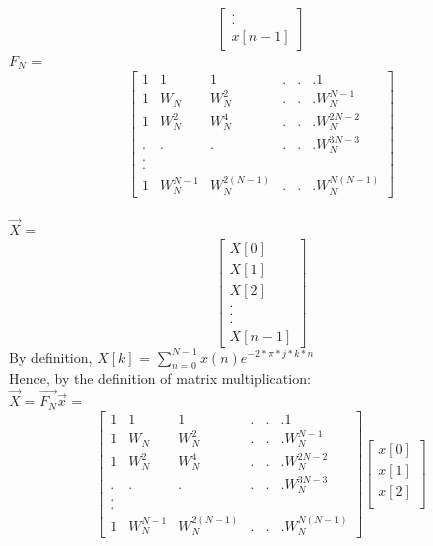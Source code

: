 \documentclass[journal,12pt,twocolumn]{IEEEtran}
\renewcommand\thesection{\arabic{section}}
\begin{document}
\begin{enumerate}[label=\arabic*.,ref=\thesection.\theenumi]
\begin{solution}
\begin{equation}
\begin{bmatrix}
		. \\
		. \\
		x[n-1]
	\end{bmatrix}
\end{equation}
$F_{N}$ =
\\
\begin{equation}
	\begin{bmatrix}
		1 & 1 & 1 & . & . & . 1 \\
		1 & W_N & W_N^{2} & . & . &. W_N^{N-1}\\
		1 & W_N^{2} & W_N^{4} & . & . &. W_N^{2N-2} \\
		. & . & . & . & . &. W_N^{3N-3}\\
		. \\
		. \\
		1 & W_N^{N-1} & W_N^{2(N-1)} & . & . &. W_N^{N(N-1)}
	\end{bmatrix}
\end{equation}
\\
$\vec{X}$ =
\begin{equation}
	\begin{bmatrix}
		X[0] \\
		X[1] \\
		X[2] \\
		. \\
		. \\
		. \\
		X[n-1]
	\end{bmatrix}
\end{equation}
By definition, $X[k]$ = $\sum_{n=0}^{N-1}x(n)e^{-2*\pi*j*k*n}$
\\Hence, by the definition of matrix multiplication:
\\$\vec{X} = \vec{F_{N}}\vec{x}$ =
\begin{equation}
	\begin{bmatrix}
		1 & 1 & 1 & . & . & . 1 \\
		1 & W_N & W_N^{2} & . & . &. W_N^{N-1}\\
		1 & W_N^{2} & W_N^{4} & . & . &. W_N^{2N-2} \\
		. & . & . & . & . &. W_N^{3N-3}\\
		. \\
		. \\
		1 & W_N^{N-1} & W_N^{2(N-1)} & . & . &. W_N^{N(N-1)}
	\end{bmatrix}
	\begin{bmatrix}
		x[0] \\
		x[1] \\
		x[2] \\

\end{bmatrix}
\end{equation}
\end{solution}
\end{enumerate}
\end{document}
